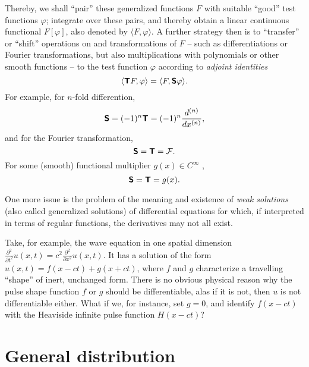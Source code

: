 Thereby, we shall ``pair'' these generalized functions $F$ with suitable ``good''
test functions $\varphi$;
integrate over these pairs, and thereby obtain a linear continuous functional
$F[\varphi]$,
also denoted by
$\langle F, \varphi \rangle $.
A further strategy
then is to ``transfer'' or ``shift'' operations on and transformations of $F$
-- such as differentiations or Fourier transformations, but also multiplications with polynomials or other smooth functions --
to the test function $\varphi$ according to
{\em adjoint identities}
\begin{equation}
\langle \textsf{\textbf{T}} F, \varphi \rangle
=
\langle F, \textsf{\textbf{S}} \varphi \rangle.
\end{equation}
For example,
for $n$-fold differention,
\begin{equation}
\textsf{\textbf{S}} = (-1)^n \textsf{\textbf{T}} = (-1)^n \frac{d^{(n)}}{dx^{(n)}},
\end{equation}
and for the Fourier transformation,
\begin{equation}
\textsf{\textbf{S}} =   \textsf{\textbf{T}} = {\cal F} .
\end{equation}
For some (smooth) functional multiplier $g(x)\in C^\infty$ ,
\begin{equation}
\textsf{\textbf{S}} =   \textsf{\textbf{T}} = g(x) .
\label{2013-m-ch-di-multipl}
\end{equation}


One more issue is the problem of the meaning and existence of
{\em weak solutions} (also called   generalized solutions)
of differential equations  for which, if interpreted in terms of regular functions,
the derivatives may not all exist.

{
\color{blue}
\bexample
Take, for example, the wave equation in one spatial dimension
$
\frac{\partial^2 }{\partial t^2} u(x,t)
=c^2
\frac{\partial^2 }{\partial x^2} u(x,t)
.
$
It has a  solution of the form \cite{Barut1990349} $ u(x,t)= f(x-ct) + g(x+ct)$,
where $f$ and $g$ characterize  a travelling ``shape'' of inert, unchanged form.
There is no obvious physical reason why the pulse shape function $f$ or $g$ should be differentiable,
alas if it is not, then $u$ is not differentiable either.
What if we, for instance, set $g=0$, and identify $f(x-ct)$ with the Heaviside infinite pulse function $H(x-ct)$?

\eexample
}


\section{General distribution}

